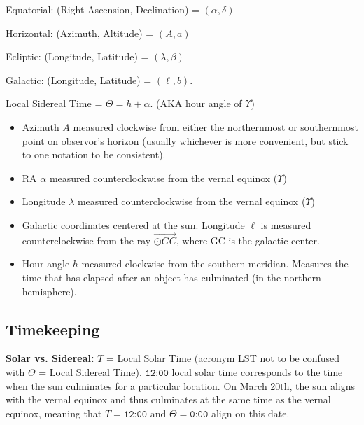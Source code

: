 \documentclass[12pt]{article}
\begin{document}
Equatorial: (Right Ascension, Declination) = $(\alpha, \delta)$

Horizontal: (Azimuth, Altitude) = $(A, a)$

Ecliptic: (Longitude, Latitude) = $(\lambda, \beta)$

Galactic: (Longitude, Latitude) = $(\ell, b)$. 

Local Sidereal Time = $\Theta = h + \alpha$. (AKA hour angle of $\Upsilon$)

\begin{itemize}
\item Azimuth $A$ measured clockwise from either the northernmost or southernmost point on observor's horizon (usually whichever is more convenient, but stick to one notation to be consistent). 

\item RA $\alpha$ measured counterclockwise from the vernal equinox ($\Upsilon$)

\item Longitude $\lambda$ measured counterclockwise from the vernal equinox ($\Upsilon$)

\item Galactic coordinates centered at the sun. Longitude $\ell$ is measured counterclockwise from the ray $\overrightarrow{\odot GC}$, where GC is the galactic center.

\item Hour angle $h$ measured clockwise from the southern meridian. Measures the time that has elapsed after an object has culminated (in the northern hemisphere).
\end{itemize}

\subsection{Timekeeping}

\textbf{Solar vs. Sidereal:} $T$ = Local Solar Time (acronym LST not to be confused with $\Theta$ = Local Sidereal Time). $\texttt{12:00}$ local solar time corresponds to the time when the sun culminates for a particular location. On March 20th, the sun aligns with the vernal equinox and thus culminates at the same time as the vernal equinox, meaning that $T = \texttt{12:00}$ and $\Theta = \texttt{0:00}$ align on this date.
\end{document}
